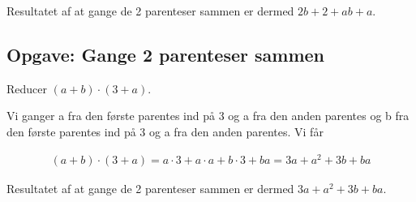 Resultatet af at gange de 2 parenteser sammen er dermed $2b + 2 + ab + a$.

\subsection{Opgave: Gange 2 parenteser sammen}
Reducer $(a+b)\cdot (3+a)$.

Vi ganger a fra den første parentes ind på 3 og a fra den anden parentes og b fra den første parentes ind på 3 og a fra den anden parentes. Vi får

\begin{align*}
(a+b)\cdot (3+a) = a\cdot 3 + a\cdot a + b\cdot 3 + ba = 3a + a^2 +3b + ba
\end{align*}

Resultatet af at gange de 2 parenteser sammen er dermed $3a + a^2 +3b + ba$.